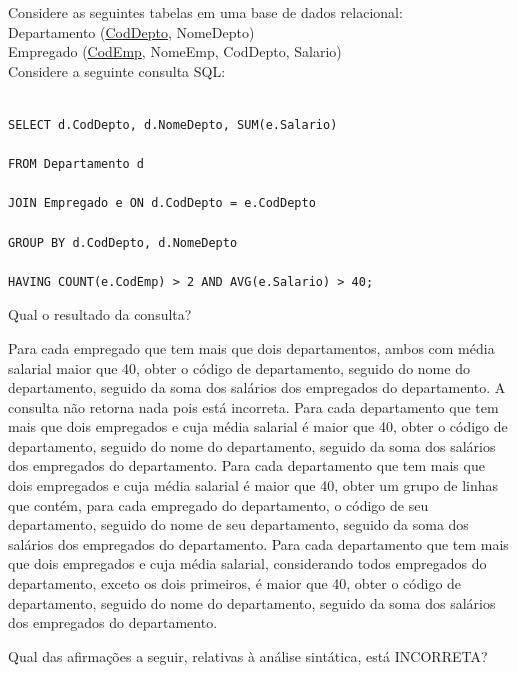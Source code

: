 \documentclass[12pt, addpoints]{exam}
\begin{document}
\begin{questions}
\question

Considere as seguintes tabelas em uma base de dados relacional:\\

Departamento (\underline{CodDepto}, NomeDepto)\\

Empregado (\underline{CodEmp}, NomeEmp, CodDepto, Salario)\\

Considere a seguinte consulta SQL:

\begin{verbatim}

SELECT d.CodDepto, d.NomeDepto, SUM(e.Salario)

FROM Departamento d

JOIN Empregado e ON d.CodDepto = e.CodDepto

GROUP BY d.CodDepto, d.NomeDepto

HAVING COUNT(e.CodEmp) > 2 AND AVG(e.Salario) > 40;

\end{verbatim}



Qual o resultado da consulta?
\begin{choices}
\choice Para cada empregado que tem mais que dois departamentos, ambos com média salarial maior que 40, obter o código de departamento, seguido do nome do departamento, seguido da soma dos salários dos empregados do departamento.
\choice A consulta não retorna nada pois está incorreta.
\choice Para cada departamento que tem mais que dois empregados e cuja média salarial é maior que 40, obter o código de departamento, seguido do nome do departamento, seguido da soma dos salários dos empregados do departamento.
\choice Para cada departamento que tem mais que dois empregados e cuja média salarial é maior que 40, obter um grupo de linhas que contém, para cada empregado do departamento, o código de seu departamento, seguido do nome de seu departamento, seguido da soma dos salários dos empregados do departamento.
\choice Para cada departamento que tem mais que dois empregados e cuja média salarial, considerando todos empregados do departamento, exceto os dois primeiros, é maior que 40, obter o código de departamento, seguido do nome do departamento, seguido da soma dos salários dos empregados do departamento.
\end{choices}

\question

Qual das afirmações a seguir, relativas à análise sintática, está INCORRETA?



\end{questions}
\end{document}
